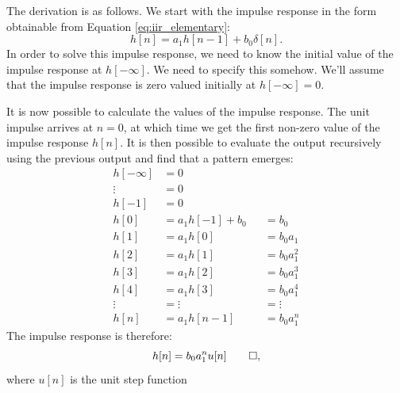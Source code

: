 The derivation is as follows. We start with the impulse response in
the form obtainable from Equation \ref{eq:iir_elementary}:
\begin{equation}
h[n] = a_1 h[n-1] + b_0 \delta[n].
\end{equation}
In order to solve this impulse response, we need to know the
initial value of the impulse response at $h[-\infty]$. We need to
specify this \emph{}
somehow. We'll assume that the impulse response is zero valued
initially at $h[-\infty]=0$.

It is now possible to calculate the values of the impulse
response. The unit impulse arrives at $n=0$, at which time we get the
first non-zero value of the impulse response $h[n]$. It is then possible to evaluate the output
recursively using the previous output and find that a pattern emerges:
\begin{align}
h[-\infty] &= 0 & &\\
\vdots &= 0 & &\\
h[-1] &= 0  & &\\
h[0] &= a_1 h[-1] + b_0  & &= b_0\\
h[1] &= a_1 h[0]        & &= b_0 a_1  \\
h[2] &= a_1 h[1]        & &= b_0 a_1^2  \\
h[3] &= a_1 h[2]        & &= b_0 a_1^3  \\
h[4] &= a_1 h[3]        & &= b_0 a_1^4  \\
\vdots &= \vdots        & &= \vdots \\
h[n] &= a_1 h[n-1] & &= b_0 a_1^n 
\end{align}
The impulse response is therefore:
\begin{equation}
h[n] =  b_0 a_1^n u[n]\qed,
\end{equation}
where $u[n]$ is the unit step function

